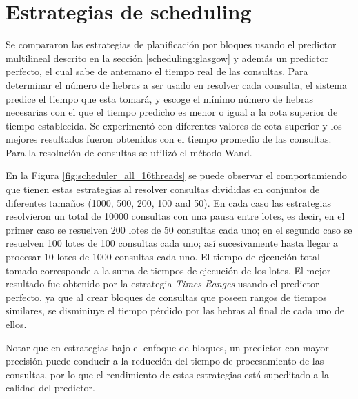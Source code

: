 \section{Estrategias de scheduling}
\label{evaluacionexperimental:estrategiasscheduling}
Se compararon las estrategias de planificación por bloques \citep{Ye:2007} usando el predictor multilineal descrito en la sección \ref{scheduling:glasgow} y además un predictor perfecto, el cual sabe de antemano el tiempo real de las consultas. Para determinar el número de hebras a ser usado en resolver cada consulta, el sistema predice el tiempo que esta tomará, y escoge el mínimo número de hebras necesarias con el que el tiempo predicho es menor o igual a la cota superior de tiempo establecida. Se experimentó con diferentes valores de cota superior y los mejores resultados fueron obtenidos con el tiempo promedio de las consultas. Para la resolución de consultas se utilizó el método Wand.

En la Figura \ref{fig:scheduler_all_16threads} se puede observar el comportamiendo que tienen estas estrategias al resolver consultas divididas en conjuntos de diferentes tamaños (1000, 500, 200, 100 and 50). En cada caso las estrategias resolvieron un total de 10000 consultas con una pausa entre lotes, es decir, en el primer caso se resuelven 200 lotes de 50 consultas cada uno; en el segundo caso se resuelven 100 lotes de 100 consultas cada uno; así sucesivamente hasta llegar a procesar 10 lotes de 1000 consultas cada uno. El tiempo de ejecución total tomado corresponde a la suma de tiempos de ejecución de los lotes. El mejor resultado fue obtenido por la estrategia \textit{Times Ranges} usando el predictor perfecto, ya que al crear bloques de consultas que poseen rangos de tiempos similares, se disminiuye el tiempo pérdido por las hebras al final de cada uno de ellos.

Notar que en estrategias bajo el enfoque de bloques, un predictor con mayor precisión puede conducir a la reducción del tiempo de procesamiento de las consultas, por lo que el rendimiento de estas estrategias está supeditado a la calidad del predictor. 

